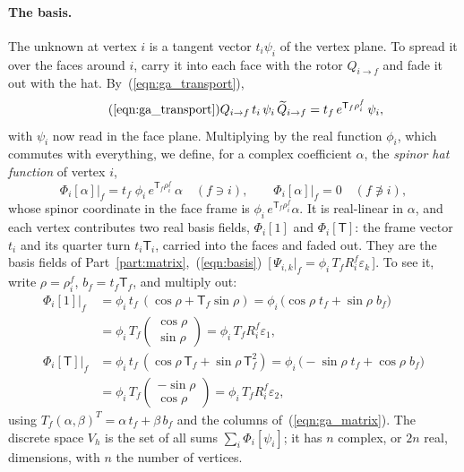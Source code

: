\paragraph{The basis.} The unknown at vertex $i$ is a tangent vector $t_i\psi_i$ of the vertex plane. To spread it over the faces around $i$, carry it into each face with the rotor $Q_{i\to f}$ and fade it out with the hat. By~(\ref{eqn:ga_transport}),
\begin{equation*}
\tag{\ref{eqn:ga_transport}}
Q_{i\to f}\, t_i\, \psi_i\, \widetilde Q_{i\to f} = t_f\, e^{\mathsf T_f \rho_i^f}\, \psi_i ,
\end{equation*}
with $\psi_i$ now read in the face plane. Multiplying by the real function $\phi_i$, which commutes with everything, we define, for a complex coefficient $\alpha$, the \emph{spinor hat function} of vertex $i$,
\begin{equation}
\label{eqn:r2_basis}
\Phi_i[\alpha]\big|_f = t_f\;\phi_i\, e^{\mathsf T_f\rho_i^f}\,\alpha \quad (f \ni i), \qquad \Phi_i[\alpha]\big|_f = 0 \quad (f \not\ni i),
\end{equation}
whose spinor coordinate in the face frame is $\phi_i\, e^{\mathsf T_f\rho_i^f}\alpha$. It is real-linear in $\alpha$, and each vertex contributes two real basis fields, $\Phi_i[1]$ and $\Phi_i[\mathsf T]$: the frame vector $t_i$ and its quarter turn $t_i\mathsf T_i$, carried into the faces and faded out. They are the basis fields of Part~\ref{part:matrix},~(\ref{eqn:basis})~[\,$\Psi_{i,k}|_f = \phi_i\, T_fR_i^f\varepsilon_k$\,]. To see it, write $\rho = \rho_i^f$, $b_f = t_f\mathsf T_f$, and multiply out:
\begin{align*}
\Phi_i[1]\big|_f &= \phi_i\, t_f\,(\cos\rho + \mathsf T_f\sin\rho) = \phi_i\,\big(\cos\rho\; t_f + \sin\rho\; b_f\big) \\
&= \phi_i\, T_f\begin{pmatrix}\cos\rho\\ \sin\rho\end{pmatrix} = \phi_i\, T_f R_i^f\varepsilon_1 , \\
\Phi_i[\mathsf T]\big|_f &= \phi_i\, t_f\,(\cos\rho\,\mathsf T_f + \sin\rho\,\mathsf T_f^2) = \phi_i\,\big(-\sin\rho\; t_f + \cos\rho\; b_f\big) \\
&= \phi_i\, T_f\begin{pmatrix}-\sin\rho\\ \cos\rho\end{pmatrix} = \phi_i\, T_f R_i^f\varepsilon_2 ,
\end{align*}
using $T_f(\alpha, \beta)^T = \alpha\, t_f + \beta\, b_f$ and the columns of~(\ref{eqn:ga_matrix}). The discrete space $V_h$ is the set of all sums $\sum_i \Phi_i[\psi_i]$; it has $n$ complex, or $2n$ real, dimensions, with $n$ the number of vertices.

